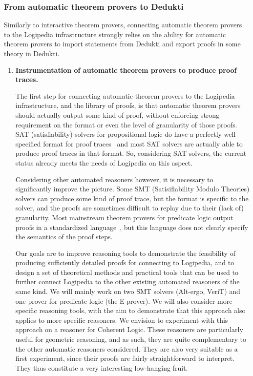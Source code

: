 \subsubsection*{From automatic theorem provers to Dedukti}

Similarly to interactive theorem provers, connecting automatic theorem
provers to the Logipedia infra\-struc\-ture strongly relies on the ability
for automatic theorem provers to import statements from Dedukti and
export proofs in some theory in Dedukti.

\begin{enumerate}[\bf(a)]
\item{\bf Instrumentation of automatic theorem provers to produce proof traces.}

  The first step for connecting automatic theorem provers to the
Logipedia infrastructure, and the library of proofs, is that automatic
theorem provers should actually output some kind of proof, without
enforcing strong requirement on the format or even the level of
granularity of those proofs.  SAT (satisfiability) solvers for
propositional logic do have a perfectly well specified format for
proof traces~\cite{DBLP:conf/sat/WetzlerHH14} and most SAT solvers are actually able to
produce proof traces in that format.  So, considering SAT solvers, the
current status already meets the needs of Logipedia on this aspect.

Considering other automated reasoners however, it is necessary to
significantly improve the picture.  Some SMT (Satisifiability Modulo
Theories) solvers can produce some kind of proof trace, but the format
is specific to the solver, and the proofs are sometimes difficult to
replay due to their (lack of) granularity.  Most mainstream theorem provers for
predicate logic output proofs in a standardized language~\cite{DBLP:conf/csr/Sutcliffe07},
but this language does not clearly specify the semantics of the proof
steps.

Our goals are to improve reasoning tools to demonstrate the feasibility of
producing sufficiently detailed proofs for connecting to Logipedia, and to
design a set of theoretical methods and practical tools that can be used to
further connect Logipedia to the other existing automated reasoners of the same
kind.  We will mainly work on two SMT solvers (Alt-ergo, VeriT) and one prover
for predicate logic (the E-prover).  We will also consider more specific
reasoning tools, with the aim to demonstrate that this approach also applies to
more specific reasoners.  We envision to experiment with this approach on a
reasoner for Coherent Logic.  These reasoners are particularly useful for
geometric reasoning, and as such, they are quite complementary to the other
automatic reasoners considered.  They are also very suitable as a first
experiment, since their proofs are fairly straightforward to interpret.  They
thus constitute a very interesting low-hanging fruit.


\end{enumerate}
